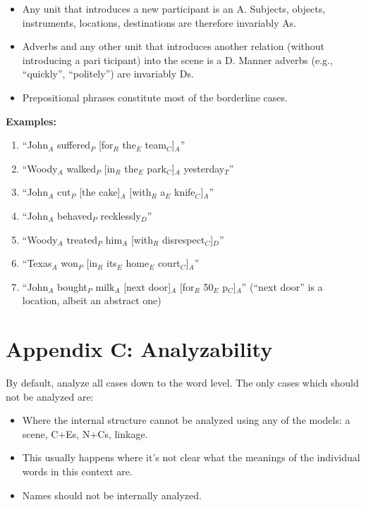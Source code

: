 \documentclass[11pt]{article}
\begin{document}
\begin{itemize}
\item
Any unit that introduces a new participant is an A. Subjects, objects, instruments, locations, destinations are therefore invariably As.
\item
Adverbs and any other unit that introduces another relation (without introducing a pari ticipant) into the scene is a D. Manner adverbs (e.g., ``quickly'', ``politely'') are invariably Ds.
\item
Prepositional phrases constitute most of the borderline cases.
\end{itemize}


{\bf Examples:}

\begin{enumerate}
\item
``John$_A$ suffered$_P$ [for$_R$ the$_E$ team$_C$]$_A$''
\item
``Woody$_A$ walked$_P$ [in$_R$ the$_E$ park$_C$]$_A$ yesterday$_T$''
\item
``John$_A$ cut$_P$ [the cake]$_A$ [with$_R$ a$_E$ knife$_C$]$_A$''
\item
``John$_A$ behaved$_P$ recklessly$_D$''
\item
``Woody$_A$ treated$_P$ him$_A$ [with$_R$ disrespect$_C$]$_D$''
\item
``Texas$_A$ won$_P$ [in$_R$ its$_E$ home$_E$ court$_C$]$_A$''
\item
``John$_A$ bought$_P$ milk$_A$ [next door]$_A$ [for$_R$ 50$_E$ p$_C$]$_A$'' (``next door'' is a location, albeit an abstract one)
\end{enumerate}


\section*{\large Appendix C: Analyzability}

By default, analyze all cases down to the word level.
The only cases which should not be analyzed are:

\begin{itemize}
\item
Where the internal structure cannot be analyzed using any of the models: a scene, C+Es, N+Cs, linkage.
\item
This usually happens where it's not clear what the meanings of the individual words in this context are.
\item
Names should not be internally analyzed.
\end{itemize}
\end{document}
